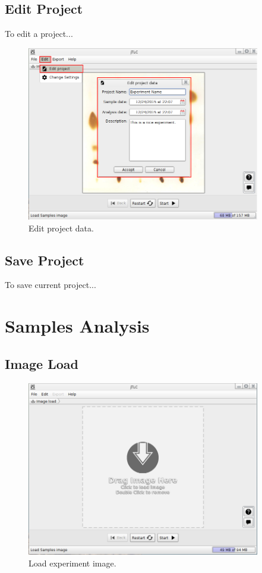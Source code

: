 \section{Edit Project}
To edit a project...
\begin{figure}[H]
	\vspace{0cm}
	\centering
	\includegraphics[width=385px]{imagenes/edit_project}
	\centering
	\vspace{-0.4cm}
	\caption{Edit project data.}
	\label{fig:edit_project}
	\vspace{-0.25cm}
\end{figure}

\section{Save Project}
To save current project...

\chapter{Samples Analysis}
\section{Image Load}
\begin{figure}[H]
	\vspace{0cm}
	\centering
	\includegraphics[width=385px]{imagenes/drop}
	\centering
	\vspace{-0.4cm}
	\caption{Load experiment image.}
	\label{fig:image_load}
	\vspace{-0.25cm}
\end{figure}

